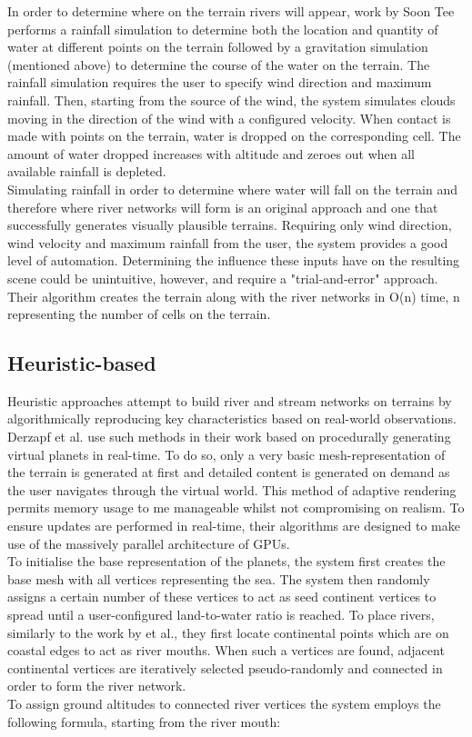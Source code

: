 In order to determine where on the terrain rivers will appear, work by Soon Tee \cite{Teoh2008} performs a rainfall simulation to determine both the location and quantity of water at different points on the terrain followed by a gravitation simulation (mentioned above) to determine the course of the water on the terrain. The rainfall simulation requires the user to specify wind direction and maximum rainfall. Then, starting from the source of the wind, the system simulates clouds moving in the direction of the wind with a configured velocity. When contact is made with points on the terrain, water is dropped on the corresponding cell. The amount of water dropped increases with altitude and zeroes out when all available rainfall is depleted. \\

Simulating rainfall in order to determine where water will fall on the terrain and therefore where river networks will form is an original approach and one that successfully generates visually plausible terrains. Requiring only wind direction, wind velocity and maximum rainfall from the user, the system provides a good level of automation. Determining the influence these inputs have on the resulting scene could be unintuitive, however, and require a "trial-and-error" approach. Their algorithm creates the  terrain along with the river networks in O(n) time, n representing the number of cells on the terrain.

\subsection{Heuristic-based}

Heuristic approaches attempt to build river and stream networks on terrains by algorithmically reproducing key characteristics based on real-world observations. \\

Derzapf et al. \cite{Derzapf2011} use such methods in their work based on procedurally generating virtual planets in real-time. To do so, only a very basic mesh-representation of the terrain is generated at first and detailed content is generated on demand as the user navigates through the virtual world. This method of adaptive rendering permits memory usage to me manageable whilst not compromising on realism. To ensure updates are performed in real-time, their algorithms are designed to make use of the massively parallel architecture of GPUs. \\
To initialise the base representation of the planets, the system first creates the base mesh with all vertices representing the sea. The system then randomly assigns a certain number of these vertices to act as seed continent vertices to spread until a user-configured land-to-water ratio is reached.
To place rivers, similarly to the work by \cite{Genevaux2013} et al., they first locate continental points which are on coastal edges to act as river mouths. When such a vertices are found, adjacent continental vertices are iteratively selected pseudo-randomly and connected in order to form the river network. \\
To assign ground altitudes to connected river vertices the system employs the following formula, starting from the river mouth:


